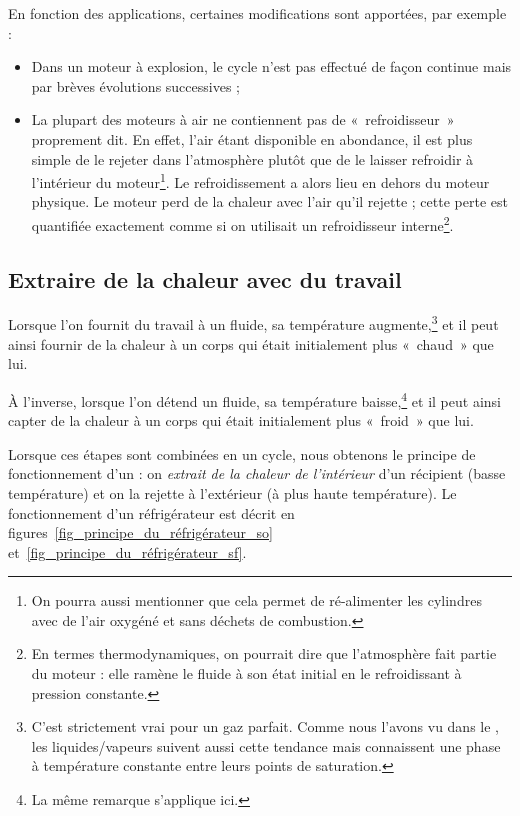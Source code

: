 		En fonction des applications, certaines modifications sont apportées, par exemple :

		\begin{itemize}
			\item Dans un moteur à explosion, le cycle n’est pas effectué de façon continue mais par brèves évolutions successives ;
			\item La plupart des moteurs à air ne contiennent pas de «~refroidisseur~» proprement dit. 
			En effet, l’air étant disponible en abondance, il est plus simple de le rejeter dans l’atmosphère plutôt que de le laisser refroidir à l’intérieur du moteur\footnote{On pourra aussi mentionner que cela permet de ré-alimenter les cylindres avec de l’air oxygéné et sans déchets de combustion.}. 
			Le refroidissement a alors lieu en dehors du moteur physique. Le moteur perd de la chaleur avec l’air qu’il rejette ; cette perte est quantifiée exactement comme si on utilisait un refroidisseur interne\footnote{En termes thermodynamiques, on pourrait dire que l’atmosphère fait partie du moteur : elle ramène le fluide à son état initial en le refroidissant à pression constante.}\nolinebreak.
		\end{itemize}


	\subsection{Extraire de la chaleur avec du travail}
	\label{ch_principe_fonctionnement_réfrigérateur}

			Lorsque l’on fournit du travail à un fluide, sa température augmente,\footnote{C’est strictement vrai pour un gaz parfait. Comme nous l’avons vu dans le \courscinq, les liquides/vapeurs suivent aussi cette tendance mais connaissent une phase à température constante entre leurs points de saturation.} et il peut ainsi fournir de la chaleur à un corps qui était initialement plus «~chaud~» que lui.

			À l’inverse, lorsque l’on détend un fluide, sa température baisse,\footnote{La même remarque s’applique ici.} et il peut ainsi capter de la chaleur à un corps qui était initialement plus «~froid~» que lui.

			Lorsque ces étapes sont combinées en un cycle, nous obtenons le principe de fonctionnement d’un  : on \emph{extrait de la chaleur de l’intérieur} d’un récipient (basse température) et on la rejette à l’extérieur (à plus haute température). Le fonctionnement d’un réfrigérateur est décrit en figures~\ref{fig_principe_du_réfrigérateur_so} et~\ref{fig_principe_du_réfrigérateur_sf}.

